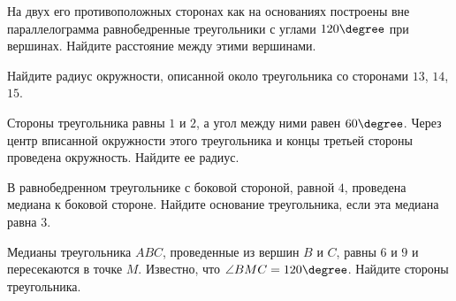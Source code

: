 \begin{class}[number=5]
\begin{listofex}
		На двух его противоположных сторонах как на основаниях построены
		вне параллелограмма равнобедренные треугольники с углами \( 120\degree \)
		при вершинах. Найдите расстояние между этими вершинами.
		\item Найдите радиус окружности, описанной около треугольника со сторонами \( 13 \), \( 14 \), \( 15 \).
		\item Стороны треугольника равны \( 1 \) и \( 2 \), а угол между
		ними равен \( 60\degree \). Через центр вписанной окружности этого треугольника и концы третьей стороны проведена окружность.
		Найдите ее радиус.
		\item В равнобедренном треугольнике с боковой стороной,
		равной \( 4 \), проведена медиана к боковой стороне. Найдите основание треугольника, если эта медиана равна \( 3 \).
		\item Медианы треугольника \( ABC \), проведенные из вершин \( B \) и \( C \), равны \( 6 \) и \( 9 \) и пересекаются в точке \( M \). Известно,
		что \( \angle BMC = 120\degree \). Найдите стороны треугольника.
	\end{listofex}
\end{class}

